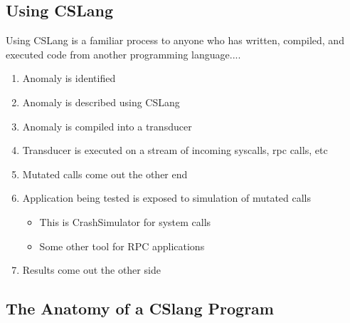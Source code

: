 \subsection{Using CSLang}

Using CSLang is a familiar process to anyone who has written, compiled, and
executed code from another programming language....

\begin{enumerate}
\item{Anomaly is identified}
\item{Anomaly is described using CSLang}
\item{Anomaly is compiled into a transducer}
\item{Transducer is executed on a stream of incoming syscalls, rpc calls, etc}
\item{Mutated calls come out the other end}
\item{Application being tested is exposed to simulation of mutated calls}
\begin{itemize}
\item{This is CrashSimulator for system calls}
\item{Some other tool for RPC applications}
\end{itemize}
\item{Results come out the other side}
\end{enumerate}

\subsection{The Anatomy of a CSlang Program}

